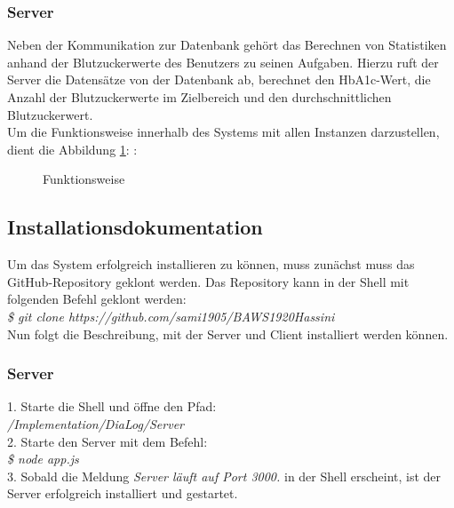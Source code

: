 	\subsubsection{Server}
	Neben der Kommunikation zur Datenbank gehört das Berechnen von Statistiken anhand der Blutzuckerwerte des Benutzers zu seinen Aufgaben. Hierzu ruft der Server die Datensätze von der Datenbank ab, berechnet den HbA1c-Wert, die Anzahl der Blutzuckerwerte im Zielbereich und den durchschnittlichen Blutzuckerwert.
	 $~$ \\
	 Um die Funktionsweise innerhalb des Systems mit allen Instanzen darzustellen, dient die Abbildung \ref{img:funktionsweise}: :
	 \begin{figure}[H]
	 \centering
	 \setlength{\fboxsep}{1pt}
	 \setlength{\fboxrule}{1pt}
	 \captionsetup{justification=centering}
	 \caption{Funktionsweise}
	 \label{img:funktionsweise}
	 \end{figure}
	 
	 \subsection{Installationsdokumentation}
	 Um das System erfolgreich installieren zu können, muss zunächst muss das GitHub-Repository geklont werden. Das Repository kann in der Shell mit folgenden Befehl geklont werden:\\	 
	 \textit{\$ git clone https://github.com/sami1905/BAWS1920Hassini}\\
	 Nun folgt die Beschreibung, mit der Server und Client installiert werden können.
	 \subsubsection{Server}
	 1. Starte die Shell und öffne den Pfad:\\
	 \textit{/Implementation/DiaLog/Server}\\
	 2. Starte den Server mit dem Befehl:\\
	 \textit{\$ node app.js}\\
	 3. Sobald die Meldung \textit{\glqq Server läuft auf Port 3000.\grqq{}} in der Shell erscheint, ist der Server erfolgreich installiert und gestartet.
